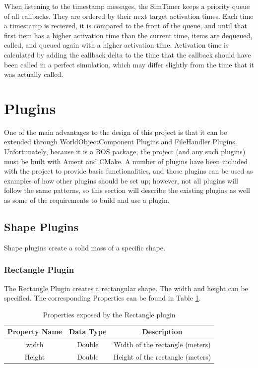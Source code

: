 \begin{itemize}
When listening to the timestamp messages, the SimTimer keeps a priority queue of all callbacks. They are ordered by their next target activation times. Each time a timestamp is recieved, it is compared to the front of the queue, and until that first item has a higher activation time than the current time, items are dequeued, called, and queued again with a higher activation time. Activation time is calculated by adding the callback delta to the time that the callback should have been called in a perfect simulation, which may differ slightly from the time that it was actually called.

\section{Plugins}
One of the main advantages to the design of this project is that it can be extended through WorldObjectComponent Plugins and FileHandler Plugins. Unfortunately, because it is a ROS package, the project (and any such plugins) must be built with Ament and CMake. A number of plugins have been included with the project to provide basic functionalities, and those plugins can be used as examples of how other plugins should be set up; however, not all plugins will follow the same patterns, so this section will describe the existing plugins as well as some of the requirements to build and use a plugin.

\subsection{Shape Plugins}
Shape plugins create a solid mass of a specific shape.

\subsubsection*{Rectangle Plugin}
The Rectangle Plugin creates a rectangular shape. The width and height
can be specified. The corresponding Properties can be found in Table \ref{tab:rectangle_props}.

\begin{table}[h!]
	\centering
	\caption{Properties exposed by the Rectangle plugin}
	\label{tab:rectangle_props}
	\begin{tabular}{c|c|c}
	Property Name & Data Type & Description\\ \hline \hline
	width & Double & Width of the rectangle (meters)\\ \hline
	Height & Double & Height of the rectangle (meters)
	\end{tabular}
\end{table}


\end{itemize}
